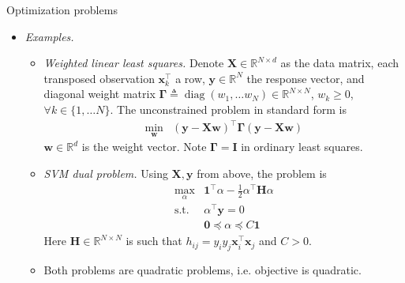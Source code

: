 \documentclass{beamer}
\numberwithin{equation}{section}
\begin{document}
\begin{frame}{Optimization problems}
    \begin{itemize}
        \item
        \textit{Examples.}
        \begin{itemize}
            \item
            \textit{Weighted linear least squares.} Denote $ \mathbf{X} \in
            \mathbb{R}^{N \times d} $ as the data matrix, each transposed
            observation $ \mathbf{x}_k^\top $ a row, $ \mathbf{y} \in
            \mathbb{R}^N $ the response vector, and diagonal weight matrix
            $ \mathbf{\Gamma} \triangleq \operatorname{diag}(w_1, \ldots w_N)
            \in \mathbb{R}^{N \times N} $, $ w_k \ge 0 $,
            $ \forall k \in \{1, \ldots N\} $. The unconstrained problem in
            standard form is
            \begin{equation*}
                \begin{array}{ll}
                    \displaystyle\min_\mathbf{w} &
                    (\mathbf{y} - \mathbf{Xw})^\top\mathbf{\Gamma}
                    (\mathbf{y} - \mathbf{Xw})                
                \end{array}
            \end{equation*}
            $ \mathbf{w} \in \mathbb{R}^d $ is the weight vector. Note
            $ \mathbf{\Gamma} = \mathbf{I} $ in ordinary least squares.

            \item
            \textit{SVM dual problem.} Using $ \mathbf{X}, \mathbf{y} $ from
            above, the problem is
            \begin{equation*}
                \begin{array}{ll}
                    \displaystyle\max_\alpha & \mathbf{1}^\top\alpha -
                    \frac{1}{2}\alpha^\top\mathbf{H}\alpha \\
                    \text{s.t.} & \alpha^\top\mathbf{y} = 0 \\
                    & \mathbf{0} \preceq \alpha \preceq C\mathbf{1}
                \end{array}
            \end{equation*}
            Here $ \mathbf{H} \in \mathbb{R}^{N \times N} $ is such that
            $ h_{ij} = y_iy_j\mathbf{x}_i^\top\mathbf{x}_j $ and $ C > 0 $.

            \item
            Both problems are quadratic problems, i.e. objective is
            quadratic.
        \end{itemize}
    \end{itemize}
\end{frame}
\end{document}
